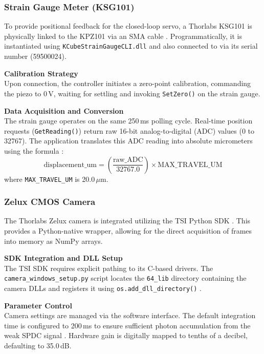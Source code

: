 \documentclass[12pt,a4paper]{article}
\begin{document}
        \subsubsection{Strain Gauge Meter (KSG101)}
        To provide positional feedback for the closed-loop servo, a Thorlabs \ac{KSG101} is physically linked to the \ac{KPZ101} via an SMA cable \cite{ThorlabsKSG101}. Programmatically, it is instantiated using \texttt{KCubeStrainGaugeCLI.dll} and also connected to via its serial number (59500024).

        \textbf{Calibration Strategy} \\
        Upon connection, the controller initiates a zero-point calibration, commanding the piezo to 0\,V, waiting for settling and invoking \texttt{SetZero()} on the strain gauge. 

        \textbf{Data Acquisition and Conversion} \\
        The strain gauge operates on the same 250\,ms polling cycle. Real-time position requests (\texttt{GetReading()}) return raw 16-bit analog-to-digital (ADC) values (0 to 32767). The application translates this ADC reading into absolute micrometers using the formula \cite{ThorlabsKSG101}:
        \begin{equation}
            \text{displacement\_um} = \left( \frac{\text{raw\_ADC}}{32767.0} \right) \times \text{MAX\_TRAVEL\_UM}
        \end{equation}
        where \texttt{MAX\_TRAVEL\_UM} is 20.0\,$\mu$m. \cite{ThorlabsKSG101}

        \subsubsection{Zelux CMOS Camera}
        The Thorlabs Zelux camera is integrated utilizing the \ac{TSI} Python \ac{SDK} \cite{ThorlabsCMOS, TSIDocs}. This provides a Python-native wrapper, allowing for the direct acquisition of frames into memory as NumPy arrays.

        \textbf{SDK Integration and DLL Setup} \\
        The \ac{TSI} \ac{SDK} requires explicit pathing to its C-based drivers. The \texttt{camera\_windows\_setup.py} script locates the \texttt{64\_lib} directory containing the camera DLLs and registers it using \texttt{os.add\_dll\_directory()} \cite{TSIGIT}.

        \textbf{Parameter Control} \\
        Camera settings are managed via the software interface. The default integration time is configured to 200\,ms to ensure sufficient photon accumulation from the weak \ac{SPDC} signal \cite{pearce2023practical}. Hardware gain is digitally mapped to tenths of a decibel, defaulting to 35.0\,dB.
\end{document}
